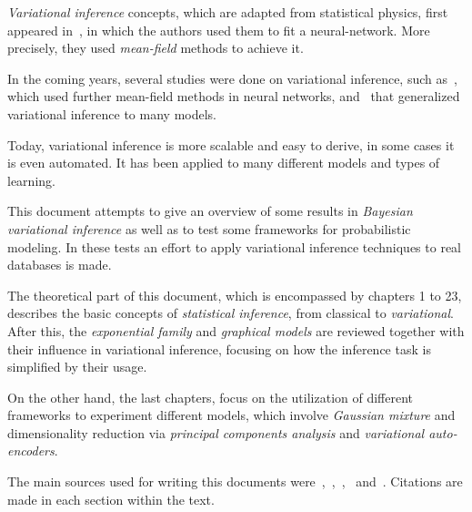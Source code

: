 
\emph{Variational inference} concepts, which are adapted from statistical physics, first appeared in~\cite{anderson1987mean}, in which the authors used them to fit a neural-network. More precisely, they used \emph{mean-field} methods to achieve it.

In the coming years, several studies were done on variational inference, such as~\cite{hinton1993keeping}, which used further mean-field methods in neural networks, and~\cite{jordan1999introduction} that generalized variational inference to many models.

Today, variational inference is more scalable and easy to derive, in some cases it is even automated. It has been applied to many different models and types of learning.

This document attempts to give an overview of some results in \emph{Bayesian variational inference} as well as to test some frameworks for probabilistic modeling. In these tests an effort to apply variational inference techniques to real databases is made.

The theoretical part of this document, which is encompassed by chapters 1 to 23, describes the basic concepts of \emph{statistical inference}, from classical to \emph{variational}. After this, the \emph{exponential family} and \emph{graphical models} are reviewed together with their influence in variational inference, focusing on how the inference task is simplified by their usage.

On the other hand, the last chapters, focus on the utilization of different frameworks to experiment different models, which involve \emph{Gaussian mixture} and dimensionality reduction via \emph{principal components analysis} and \emph{variational auto-encoders}.

The main sources used for writing this documents were~\cite{barber},~\cite{bishop2006pattern},~\cite{koller_friedman},~\cite{masegosa2019probabilistic} and~\cite{blei2017variational}. Citations are made in each section within the text.
